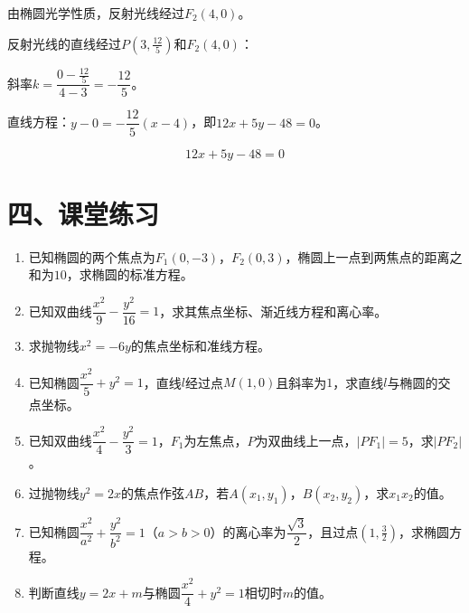 \documentclass[12pt, a4paper]{ctexart}
\begin{document}
由椭圆光学性质，反射光线经过$F_2(4, 0)$。

反射光线的直线经过$P(3, \frac{12}{5})$和$F_2(4, 0)$：

斜率$k = \dfrac{0 - \frac{12}{5}}{4 - 3} = -\dfrac{12}{5}$。

直线方程：$y - 0 = -\dfrac{12}{5}(x - 4)$，即$12x + 5y - 48 = 0$。

$$\boxed{12x + 5y - 48 = 0}$$

\newpage

\section*{\textcolor{tipgreen}{四、课堂练习}}

\begin{enumerate}[leftmargin=1.5em]

\item 已知椭圆的两个焦点为$F_1(0, -3)$，$F_2(0, 3)$，椭圆上一点到两焦点的距离之和为$10$，求椭圆的标准方程。

\item 已知双曲线$\dfrac{x^2}{9} - \dfrac{y^2}{16} = 1$，求其焦点坐标、渐近线方程和离心率。

\item 求抛物线$x^2 = -6y$的焦点坐标和准线方程。

\item 已知椭圆$\dfrac{x^2}{5} + y^2 = 1$，直线$l$经过点$M(1, 0)$且斜率为$1$，求直线$l$与椭圆的交点坐标。

\item 已知双曲线$\dfrac{x^2}{4} - \dfrac{y^2}{3} = 1$，$F_1$为左焦点，$P$为双曲线上一点，$|PF_1| = 5$，求$|PF_2|$。

\item 过抛物线$y^2 = 2x$的焦点作弦$AB$，若$A(x_1, y_1)$，$B(x_2, y_2)$，求$x_1 x_2$的值。

\item 已知椭圆$\dfrac{x^2}{a^2} + \dfrac{y^2}{b^2} = 1$（$a > b > 0$）的离心率为$\dfrac{\sqrt{3}}{2}$，且过点$(1, \frac{3}{2})$，求椭圆方程。

\item 判断直线$y = 2x + m$与椭圆$\dfrac{x^2}{4} + y^2 = 1$相切时$m$的值。

\end{enumerate}

\vspace{12pt}
\end{document}
